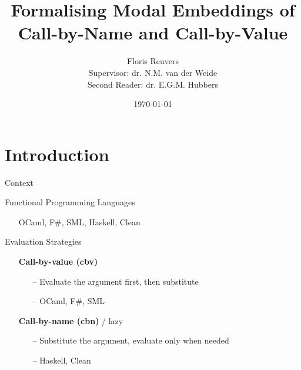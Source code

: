 \documentclass{beamer}
\title{Formalising Modal Embeddings of Call-by-Name and Call-by-Value}
\date{\today}
\author[Floris Reuvers]{Floris Reuvers \\[1ex]
  \small Supervisor: dr. N.M. van der Weide \\
  \small Second Reader: dr. E.G.M. Hubbers
}
\institute{Radboud University} %
\theoremstyle{definition}
\begin{document}
  \maketitle
  
  \section{Introduction}

  \begin{frame}{Context}
    \begin{block}{Functional Programming Languages}
      \begin{itemize}
        \item[\textbullet] OCaml, F\#, SML, Haskell, Clean
      \end{itemize}
    \end{block}

    \begin{block}{Evaluation Strategies}
      \begin{itemize}
        \item[\textbullet] \textbf{Call-by-value (\textsf{cbv})}
          \begin{itemize}
            \item[--] Evaluate the argument first, then substitute
            \item[--] OCaml, F\#, SML
          \end{itemize}
        \item[\textbullet] \textbf{Call-by-name (\textsf{cbn})} / lazy
          \begin{itemize}
            \item[--] Substitute the argument, evaluate only when needed
            \item[--] Haskell, Clean
          \end{itemize}
      \end{itemize}
    \end{block}
  \end{frame}

\end{document}
